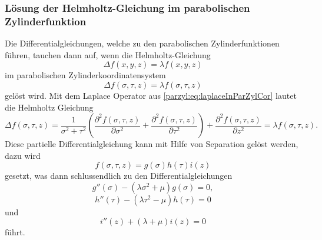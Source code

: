 \subsubsection{Lösung der Helmholtz-Gleichung im parabolischen Zylinderfunktion}
Die Differentialgleichungen, welche zu den parabolischen Zylinderfunktionen führen, tauchen
dann auf, wenn die Helmholtz-Gleichung
\begin{equation}
	\Delta f(x,y,z) = \lambda f(x,y,z) 
\end{equation}
im parabolischen Zylinderkoordinatensystem
\begin{equation}
	\Delta f(\sigma,\tau,z) = \lambda f(\sigma,\tau,z) 
\end{equation}
gelöst wird.
Mit dem Laplace Operator aus \eqref{parzyl:eq:laplaceInParZylCor} lautet die Helmholtz Gleichung
\begin{equation}
	\Delta f(\sigma, \tau, z)
	=
	\frac{1}{\sigma^2 + \tau^2}
	\left ( 
	\frac{\partial^2 f(\sigma,\tau,z)}{\partial \sigma^2} 
	+ 
	\frac{\partial^2 f(\sigma,\tau,z)}{\partial \tau^2}
	\right )
	+ 
	\frac{\partial^2 f(\sigma,\tau,z)}{\partial z^2}
	= 
	\lambda f(\sigma,\tau,z).
\end{equation}
Diese partielle Differentialgleichung kann mit Hilfe von Separation gelöst werden, dazu wird 
\begin{equation}
	f(\sigma,\tau,z) = g(\sigma)h(\tau)i(z)
\end{equation}
gesetzt, was dann schlussendlich zu den Differentialgleichungen 
\begin{equation}\label{parzyl:sep_dgl_1}
	g''(\sigma) 
	- 
	\left (
	\lambda\sigma^2
	+
	\mu 
	\right )
	g(\sigma)
	=
	0,
\end{equation}
\begin{equation}\label{parzyl:sep_dgl_2}
	h''(\tau) 
	- 
	\left (
	\lambda\tau^2
	-
	\mu 
	\right )
	h(\tau)
	=
	0
\end{equation}
und
\begin{equation}\label{parzyl:sep_dgl_3}
	i''(z) 
	+
	\left (
	\lambda
	+
	\mu 
	\right )
	i(z)
	=
	0
\end{equation}
führt.




